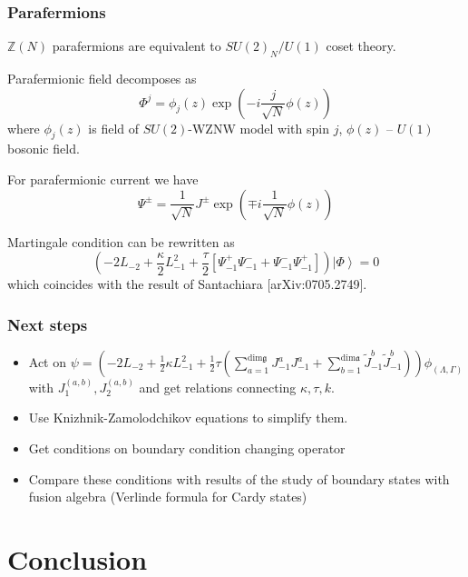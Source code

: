 \documentclass[pdftex]{beamer}
\newcommand{\gf}{\mathfrak{g}}
\newcommand{\af}{\mathfrak{a}}
\theoremstyle{definition} \newtheorem{Def}{Definition}
\begin{document}
\begin{frame}
  \frametitle{Parafermions}
  $\mathbb{Z}(N)$ parafermions are equivalent to $SU(2)_{N}/U(1)$ coset theory.
  
  Parafermionic field decomposes as
  \begin{equation*}
    \Phi^{j}=\phi_{j}(z) \exp\left( -i \frac{j}{\sqrt{N}}\phi(z)\right)
  \end{equation*}
  where $\phi_{j}(z)$ is field of $SU(2)$-WZNW model with spin $j$, $\phi(z)$ -- $U(1)$ bosonic field.
  
  For parafermionic current we have
  \begin{equation*}
    \Psi^{\pm}=\frac{1}{\sqrt{N}} J^{\pm}\exp\left(\mp i \frac{1}{\sqrt{N}}\phi(z)\right)
  \end{equation*}

  Martingale condition can be rewritten as
  \begin{equation*}
    \left(-2 L_{-2}+\frac{\kappa}{2}L_{-1}^{2}+\frac{\tau}{2}\left[\Psi^{+}_{-1}\Psi^{-}_{-1}+\Psi^{-}_{-1}\Psi^{+}_{-1}\right]\right) \left|\Phi\right>=0
  \end{equation*}
  which coincides with the result of Santachiara [arXiv:0705.2749].
\end{frame}

\begin{frame}
  \frametitle{Next steps}
  \begin{itemize}
  \item Act on $  \psi=\left(-2L_{-2}+\frac{1}{2}\kappa L_{-1}^{2}+\frac{1}{2}\tau \left(\sum\limits_{a=1}^{\mathrm{dim}\gf}J^{a}_{-1}J^{a}_{-1}+\sum\limits_{b=1}^{\mathrm{dim}\af}\tilde{J}^{b}_{-1}\tilde{J}^{b}_{-1}\right)\right) \phi_{(\Lambda,\Gamma)}$ with $J^{(a,b)}_{1}, J^{(a,b)}_{2}$ and get relations connecting $\kappa, \tau, k$. 
  \item Use Knizhnik-Zamolodchikov equations to simplify them.
  \item Get conditions on boundary condition changing operator
  \item Compare these conditions with results of  the study of boundary states with fusion algebra (Verlinde formula for Cardy states)
  \end{itemize}
\end{frame}

\section{Conclusion}
\label{sec:conclusion}
\end{document}
